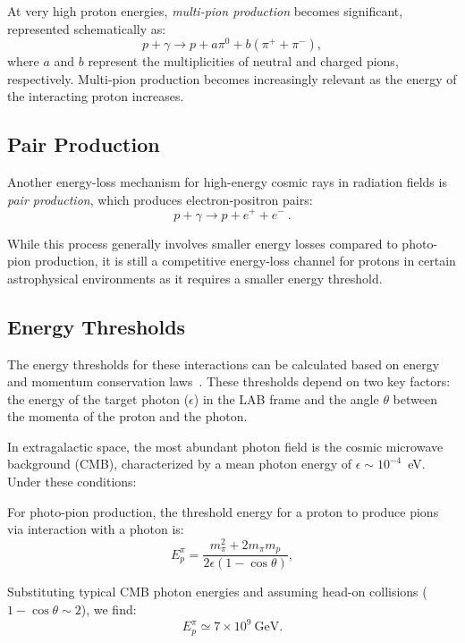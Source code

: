 At very high proton energies, \emph{multi-pion production} becomes significant, represented schematically as:
\begin{equation}
p + \gamma \rightarrow p + a \pi^0 + b (\pi^+ + \pi^-),
\end{equation}
where \(a\) and \(b\) represent the multiplicities of neutral and charged pions, respectively. 
%
Multi-pion production becomes increasingly relevant as the energy of the interacting proton increases.  

\subsection{Pair Production}

Another energy-loss mechanism for high-energy cosmic rays in radiation fields is \emph{pair production}, which produces electron-positron pairs:  
\begin{equation}
p + \gamma \rightarrow p + e^+ + e^-~.
\end{equation}  

While this process generally involves smaller energy losses compared to photo-pion production, it is still a competitive energy-loss channel for protons in certain astrophysical environments as it requires a smaller energy threshold.  

\subsection{Energy Thresholds}

The energy thresholds for these interactions can be calculated based on energy and momentum conservation laws~\cite{appendix}. These thresholds depend on two key factors: the energy of the target photon (\(\epsilon\)) in the LAB frame and the angle \(\theta\) between the momenta of the proton and the photon.  

In extragalactic space, the most abundant photon field is the cosmic microwave background (CMB), characterized by a mean photon energy of \(\epsilon \sim 10^{-4}\)~eV. Under these conditions:  

For photo-pion production, the threshold energy for a proton to produce pions via interaction with a photon is:  
\begin{equation}
E_p^\pi = \frac{m_\pi^2 + 2 m_\pi m_p}{2 \epsilon (1 - \cos \theta)},
\end{equation}

Substituting typical CMB photon energies and assuming head-on collisions (\(1 - \cos \theta \sim 2\)), we find:
\begin{equation}
E_p^\pi \simeq 7 \times 10^{9}~\text{GeV}.
\end{equation}

